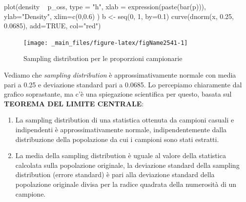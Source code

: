 \documentclass[a4paper,12pt,oneside]{book}
\providecommand{\tightlist}{%
  \setlength{\itemsep}{0pt}\setlength{\parskip}{0pt}}
\newenvironment{Shaded}{}{}
\newcommand{\KeywordTok}[1]{#1}
\newcommand{\DataTypeTok}[1]{#1}
\newcommand{\DecValTok}[1]{#1}
\newcommand{\FloatTok}[1]{#1}
\newcommand{\StringTok}[1]{#1}
\newcommand{\OtherTok}[1]{#1}
\newcommand{\OperatorTok}[1]{#1}
\newcommand{\NormalTok}[1]{#1}
\begin{document}
\begin{Shaded}
\begin{Highlighting}[]
\KeywordTok{plot}\NormalTok{(density }\OperatorTok{~}\StringTok{ }\NormalTok{p_oss, }\DataTypeTok{type =} \StringTok{"h"}\NormalTok{,}
     \DataTypeTok{xlab =} \KeywordTok{expression}\NormalTok{(}\KeywordTok{paste}\NormalTok{(}\KeywordTok{bar}\NormalTok{(p))),}
     \DataTypeTok{ylab=}\StringTok{"Density"}\NormalTok{, }
    \DataTypeTok{xlim=}\KeywordTok{c}\NormalTok{(}\DecValTok{0}\NormalTok{,}\FloatTok{0.6}\NormalTok{) )}
\NormalTok{b <-}\StringTok{ }\KeywordTok{seq}\NormalTok{(}\DecValTok{0}\NormalTok{, }\DecValTok{1}\NormalTok{, }\DataTypeTok{by=}\FloatTok{0.1}\NormalTok{)}
\KeywordTok{curve}\NormalTok{(}\KeywordTok{dnorm}\NormalTok{(x, }\FloatTok{0.25}\NormalTok{, }\FloatTok{0.0685}\NormalTok{), }\DataTypeTok{add=}\OtherTok{TRUE}\NormalTok{, }\DataTypeTok{col=}\StringTok{"red"}\NormalTok{)}
\end{Highlighting}
\end{Shaded}

\begin{figure}

{\centering \texttt{[image: \_main\_files/figure-latex/figName2541-1]} 

}

\caption{Sampling distribution per le proporzioni campionarie}\label{fig:figName2541}
\end{figure}

Vediamo che \emph{sampling distribution} è approssimativamente normale con media pari a 0.25 e deviazione standard pari a 0.0685. Lo percepiamo chiaramente dal grafico soprastante, ma c'è una spiegazione scientifica per questo, basata sul \textbf{TEOREMA DEL LIMITE CENTRALE}:

\begin{enumerate}
\def\labelenumi{\arabic{enumi}.}
\tightlist
\item
  La sampling distribution di una statistica ottenuta da campioni casuali e indipendenti è approssimativamente normale, indipendentemente dalla distribuzione della popolazione da cui i campioni sono stati estratti.
\item
  La media della sampling distribution è uguale al valore della statistica calcolata sulla popolazione originale, la deviazione standard della sampling distribution (errore standard) è pari alla deviazione standard della popolazione originale divisa per la radice quadrata della numerosità di un campione.
\end{enumerate}
\end{document}
